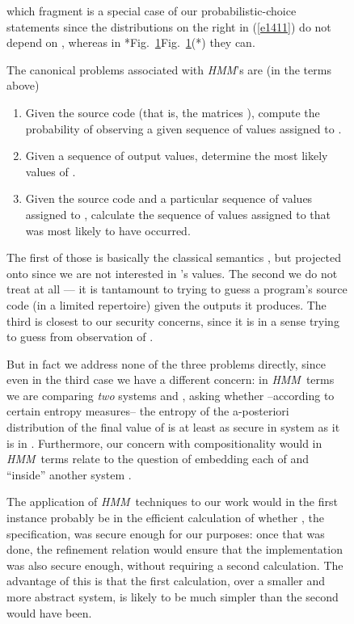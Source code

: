 \documentclass[runningheads]{llncs}
\newcommand\Eqn[1] {(\ref{#1})}
\newcommand\HMM {\textit{HMM}}
\newenvironment{Figure}[2][t]{\begin{figure}[#1]\def\Label{#2}\small}{\label{\Label}\end{figure}}
\newcommand\Fig[2][*] {{\def\z{#1}\if*\z Fig.~\ref{#2}\else Fig.~\ref{#2}(#1)\fi}}
\begin{document}
\begin{Figure}[ht!]{f1228}
which fragment is a special case of our probabilistic-choice statements since the distributions on the right in \Eqn{e1411} do not depend on , whereas in \Fig{f1228} they can.

The canonical problems associated with \HMM's are (in the terms above)
\begin{enumerate}
\item Given the source code (that is, the matrices ), compute the probability of observing a given sequence of values assigned to .
\item Given a sequence of output values, determine the most likely values of .
\item Given the source code and a particular sequence of values assigned to , calculate the sequence of values assigned to  that was most likely to have occurred.
\end{enumerate}

The first of those is basically the classical semantics \cite{Kozen:85,McIver:05a}, but projected onto  since we are not interested in 's values. The second we do not treat at all --- it is tantamount to trying to guess a program's source code (in a limited repertoire) given the outputs it produces. The third is closest to our security concerns, since it is in a sense trying to guess  from observation of .

But in fact we address none of the three problems directly, since even in the third case we have a different concern: in \HMM\ terms we are comparing \emph{two} systems   and , asking  whether --according to certain entropy measures-- the entropy of the a-posteriori distribution of the final value of  is at least as secure in system  as it is in . Furthermore, our concern with compositionality would in \HMM\ terms relate to the question of embedding each of  and  ``inside'' another system .

The application of \HMM\ techniques to our work would in the first instance probably be in the efficient calculation of whether , the specification, was secure enough for our purposes: once that was done, the refinement relation would ensure that the implementation  was also secure enough, without requiring a second calculation. The advantage of this is that the first calculation, over a smaller and more abstract system, is likely to be much simpler than the second would have been.




\newpage
\appendix


\end{Figure}
\end{document}
